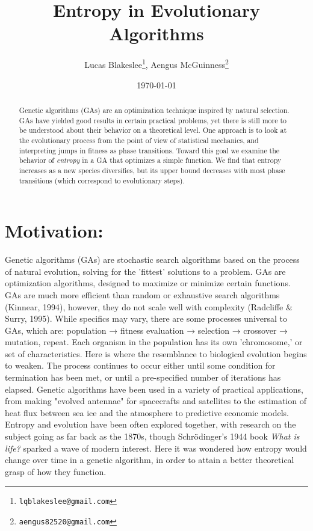 \documentclass[11pt]{article}
\date{\today}
\title{Entropy in Evolutionary Algorithms}
\author{Lucas Blakeslee\footnote{\texttt{lqblakeslee@gmail.com}},
  Aengus McGuinness\footnote{\texttt{aengus82520@gmail.com}}}
\begin{document}
\maketitle


\label{sec:org26f53e0}
\begin{abstract}
\label{sec:orga17da23}

Genetic algorithms (GAs) are an optimization technique inspired by
natural selection. GAs have yielded good results in certain practical
problems, yet there is still more to be understood about their
behavior on a theoretical level. One approach is to look at the
evolutionary process from the point of view of statistical mechanics,
and interpreting jumps in fitness as phase transitions. Toward this
goal we examine the behavior of \emph{entropy} in a GA that optimizes
a simple function.  We find that entropy increases as a new species
diversifies, but its upper bound decreases with most phase
transitions (which correspond to evolutionary steps).
\end{abstract}




\section{Motivation:}
\label{sec:org16abecd}
Genetic algorithms (GAs) are stochastic search algorithms based on the
process of natural evolution, solving for the 'fittest' solutions to a
problem. GAs are optimization algorithms, designed to maximize or
minimize certain functions. GAs are much more efficient than random or
exhaustive search algorithms (Kinnear, 1994), however, they do not
scale well with complexity (Radcliffe \& Surry, 1995). While specifics
may vary, there are some processes universal to GAs, which are:
population → fitness evaluation → selection → crossover → mutation,
repeat. Each organism in the population has its own 'chromosome,' or
set of characteristics. Here is where the resemblance to biological
evolution begins to weaken. The process continues to occur either
until some condition for termination has been met, or until a
pre-specified number of iterations has elapsed. Genetic algorithms
have been used in a variety of practical applications, from making
"evolved antennae" for spacecrafts and satellites to the estimation of
heat flux between sea ice and the atmosphere to predictive economic
models. Entropy and evolution have been often explored together, with
research on the subject going as far back as the 1870s, though
Schrödinger's 1944 book \emph{What is life?} sparked a wave of modern
interest. Here it was wondered how entropy would change over time in a
genetic algorithm, in order to attain a better theoretical grasp of
how they function.
\end{document}
